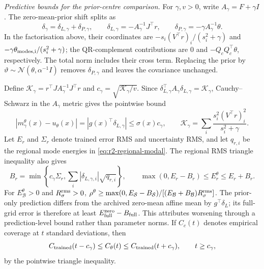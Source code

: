 \emph{Predictive bounds for the prior-centre comparison.}\label{app:r3:centres}
For $\gamma,v>0$, write $A_\gamma=F+\gamma I$. The zero-mean-prior shift splits as
\[
 \delta_\gamma=\delta_{L,\gamma}+\delta_{P,\gamma},\qquad
 \delta_{L,\gamma}=-A_\gamma^{-1}J^\top r,\qquad
 \delta_{P,\gamma}=-\gamma A_\gamma^{-1}\theta.
\]
In the factorisation above, their coordinates are
$-s_i(V^\top r)_i/(s_i^2+\gamma)$ and
$-\gamma\theta_{\rm modes,i}/(s_i^2+\gamma)$; the QR-complement contributions
are $0$ and $-Q_cQ_c^\top\theta$, respectively. The total norm includes their
cross term. Replacing the prior by $\vartheta\sim\mathcal N(\theta,\alpha^{-1}I)$
removes $\delta_{P,\gamma}$ and leaves the covariance unchanged.

Define $\mathcal K_\gamma=r^\top J A_\gamma^{-1}J^\top r$ and
$c_\gamma=\sqrt{\mathcal K_\gamma/v}$. Since
$\delta_{L,\gamma}^\top A_\gamma\delta_{L,\gamma}=\mathcal K_\gamma$,
Cauchy--Schwarz in the $A_\gamma$ metric gives the pointwise bound
\begin{equation}\label{eq:r3:centre-bound}
 |m^\theta_\gamma(x)-u_\theta(x)|
 =|g(x)^\top\delta_{L,\gamma}|
 \le\sigma(x)c_\gamma,\qquad
 \mathcal K_\gamma=\sum_i\frac{s_i^2(V^\top r)_i^2}{s_i^2+\gamma}.
\end{equation}
Let $E_r$ and $\Sigma_r$ denote trained error RMS and uncertainty RMS, and let
$q_{r,i}$ be the regional mode energies in \eqref{eq:r2-regional-modal}.
The regional RMS triangle inequality also gives
\begin{equation}\label{eq:r3:regional-bound}
 B_r=\min\!\left\{c_\gamma\Sigma_r,
              \sum_i|\delta_{L,\gamma,i}|\sqrt{q_{r,i}}\right\},\qquad
 \max(0,E_r-B_r)\le E^\theta_r\le E_r+B_r.
\end{equation}
For $E^\theta_{\mathcal B}>0$ and $R_{\sigma}^{\mathrm{rms}}>0$,
$\rho^\theta\ge\max(0,E_{\mathcal S}-B_{\mathcal S})/
[(E_{\mathcal B}+B_{\mathcal B})R_{\sigma}^{\mathrm{rms}}]$.
The prior-only prediction differs from
the archived zero-mean affine mean by $g^\top\delta_L$; its full-grid error is
therefore at least $E^{\rm zero}_{\rm full}-B_{\rm full}$. This attributes
worsening through a prediction-level bound rather than parameter norms.
If $C_c(t)$ denotes empirical coverage at $t$ standard deviations, then
\[
 C_{\rm trained}(t-c_\gamma)\le C_\theta(t)
       \le C_{\rm trained}(t+c_\gamma),\qquad t\ge c_\gamma,
\]
by the pointwise triangle inequality.



